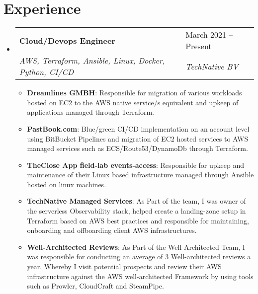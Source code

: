 \documentclass[letterpaper,11pt]{article}
\makeatletter
\newcommand{\resumeItem}[1]{
  \item\small{
    {#1 \vspace{-2pt}}
  }
}
\newcommand{\resumeSubheading}[4]{
  \vspace{-2pt}\item
    \begin{tabular*}{\textwidth}{@{\extracolsep{\fill}}p{0.9\textwidth}p{0.4\textwidth}@{}}
      \textbf{#1} & #2 \\
      \textit{\small#3} & \textit{\small #4} \\
    \end{tabular*}\vspace{-7pt}
}
\newcommand{\resumeSubSubheading}[2]{
    \item
    \begin{tabular*}{0.97\textwidth}{l@{\extracolsep{\fill}}r}
      \textit{\small#1} & \textit{\small #2} \\
    \end{tabular*}\vspace{-7pt}
}
\newcommand{\resumeSubHeadingListStart}{\begin{itemize}[leftmargin=0.15in, label={}]}
\newcommand{\resumeSubHeadingListEnd}{\end{itemize}}
\newcommand{\resumeItemListStart}{\begin{itemize}}
\newcommand{\resumeItemListEnd}{\end{itemize}\vspace{-5pt}}
\makeatother
\begin{document}

\section{Experience}
  \resumeSubHeadingListStart

    \resumeSubheading
      {Cloud/Devops Engineer}{March 2021 -- Present}
      {AWS, Terraform, Ansible, Linux, Docker, Python, CI/CD}{TechNative BV}
      \resumeItemListStart
        \resumeItem{\textbf{Dreamlines GMBH}: Responsible for migration of various workloads hosted on EC2 to the AWS native service/s equivalent and upkeep of applications managed through Terraform.}
        \resumeItem{\textbf{PastBook.com}: Blue/green CI/CD implementation on an account level using BitBucket Pipelines and migration of EC2 hosted services to AWS managed services such as ECS/Route53/DynamoDb through Terraform.}
        \resumeItem{\textbf{TheClose App field-lab events-access}: Responsible for upkeep and maintenance of their Linux based infrastructure managed through Ansible hosted on linux machines.}
        \resumeItem{\textbf{TechNative Managed Services}: As Part of the team, I was owner of the serverless Observability stack, helped create a landing-zone setup in Terraform based on AWS best practices and responsible for maintaining, onboarding and offboarding client AWS infrastructures.}
        \resumeItem{\textbf{Well-Architected Reviews}: As Part of the Well Architected Team, I was responsible for conducting an average of 3 Well-architected reviews a year. Whereby I visit potential prospects and review their AWS infrastructure against the AWS well-architected Framework by using tools such as Prowler, CloudCraft and SteamPipe.}
      \resumeItemListEnd
  \resumeSubHeadingListEnd
\end{document}
